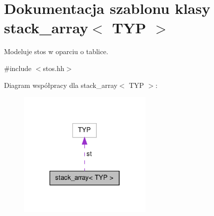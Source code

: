 \hypertarget{classstack__array}{\section{\-Dokumentacja szablonu klasy stack\-\_\-array$<$ \-T\-Y\-P $>$}
\label{classstack__array}
}


\-Modeluje stos w oparciu o tablice.  




{\ttfamily \#include $<$stos.\-hh$>$}



\-Diagram współpracy dla stack\-\_\-array$<$ \-T\-Y\-P $>$\-:
\nopagebreak
\begin{figure}[H]
\begin{center}
\leavevmode
\includegraphics[width=184pt]{classstack__array__coll__graph}
\end{center}
\end{figure}
